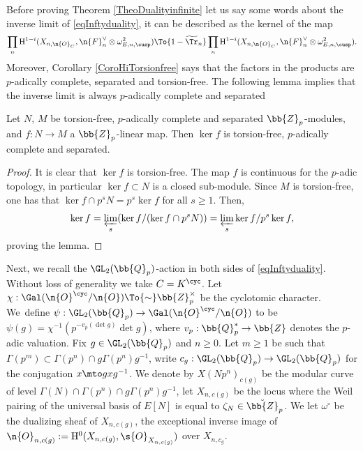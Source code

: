 Before proving Theorem \ref{TheoDualityinfinite} let us say some words about the inverse limit of \eqref{eqInftyduality}, it can be described as the kernel of the map
\[
\prod_{n} \mathrm{H}^{1-i}(X_{n,\n{O}_C}, \n{F}_n^{\vee} \otimes \omega^2_{E,n,\cusp}) \To{1- \widetilde{\Tr}_n} \prod_{n} \mathrm{H}^{1-i}(X_{n,\n{O}_C}, \n{F}_n^{\vee} \otimes \omega^2_{E,n,\cusp}).
\]
Moreover, Corollary \ref{CoroHiTorsionfree} says that the factors in the products are $p$-adically complete, separated and torsion-free. The following lemma implies that the inverse limit is always $p$-adically complete and separated

\begin{lem}
Let $N$, $M$ be torsion-free, $p$-adically complete and separated $\bb{Z}_p$\nobreakdash-mod\-ules, and $f:N \to M$ a $\bb{Z}_p$-linear map. Then $\ker f$ is torsion-free, $p$-adically complete and separated.
\end{lem}

\begin{proof}
It is clear that $\ker f$ is torsion-free. The map $f$ is continuous for the $p$-adic topology, in particular $\ker f \subset N$ is a closed sub-module. Since $M$ is torsion-free, one has that $\ker f\cap p^sN = p^s \ker f $ for all $s\geq 1$. Then,
\[
\ker f = \varprojlim_s (\ker f/ (\ker f\cap p^s N))= \varprojlim_s \ker f/p^s \ker f,
\]
proving the lemma.
\end{proof}

Next, we recall the $\GL_2(\bb{Q}_p)$-action in both sides of \eqref{eqInftyduality}. Without loss of generality we take $C=K^{\cyc}$. Let $ \chi: \Gal(\n{O}^{\cyc}/ \n{O}) \To{\sim} \bb{Z}_p^{\times} $ be the cyclotomic character. We~define $\psi: \GL_2(\bb{Q}_p)\to \Gal(\n{O}^{\cyc}/ \n{O})$ to be $\psi(g)= \chi^{-1} (p^{-v_p(\det g)} \det g)$, where $v_p: \bb{Q}_p^*\to \bb{Z}$ denotes the $p$-adic valuation. Fix $g\in \GL_2(\bb{Q}_p)$ and $n\geq 0$. Let $m\geq 1$ be such that $\Gamma(p^m)\subset \Gamma(p^n)\cap g \Gamma(p^n)g^{-1}$, write $c_g: \GL_2(\bb{Q}_p)\to \GL_2(\bb{Q}_p)$ for the conjugation $x\mto g x g^{-1}$. We denote by $X(Np^n)_{c(g)}$ be the modular curve of level $\Gamma(N)\cap \Gamma(p^n)\cap g \Gamma(p^n) g^{-1}$, let $X_{n,c(g)}$ be the locus where the Weil pairing of the universal basis of $E[N]$ is equal to $\zeta_N\in \breve{\bb{Z}}_p$. We let $\omega^{\circ}$ be the dualizing sheaf of $X_{n,c(g)}$, \ie the exceptional inverse image of $\n{O}_{n,c(g)}:= \mathrm{H}^0(X_{n,c(g)}, \s{O}_{X_{n,c(g)}})$ over $X_{n,c_{g}}$.

